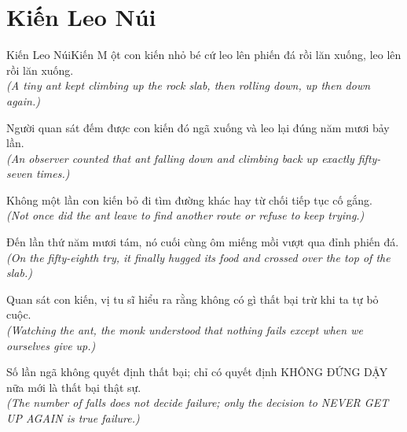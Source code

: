 \section{Kiến Leo Núi}
\begin{truyen}{Kiến Leo Núi}{Kiến}
M ột con kiến nhỏ bé cứ leo lên phiến đá rồi lăn xuống, leo lên rồi lăn xuống.\\
\textit{(A tiny ant kept climbing up the rock slab, then rolling down, up then down again.)}

Người quan sát đếm được con kiến đó ngã xuống và leo lại đúng năm mươi bảy lần.\\
\textit{(An observer counted that ant falling down and climbing back up exactly fifty-seven times.)}

Không một lần con kiến bỏ đi tìm đường khác hay từ chối tiếp tục cố gắng.\\
\textit{(Not once did the ant leave to find another route or refuse to keep trying.)}

Đến lần thứ năm mươi tám, nó cuối cùng ôm miếng mồi vượt qua đỉnh phiến đá.\\
\textit{(On the fifty-eighth try, it finally hugged its food and crossed over the top of the slab.)}

Quan sát con kiến, vị tu sĩ hiểu ra rằng không có gì thất bại trừ khi ta tự bỏ cuộc.\\
\textit{(Watching the ant, the monk understood that nothing fails except when we ourselves give up.)}

\end{truyen}
\begin{baihoc}
  Số lần ngã không quyết định thất bại; chỉ có quyết định KHÔNG ĐỨNG DẬY nữa mới là thất bại thật sự.\\
  \textit{(The number of falls does not decide failure; only the decision to NEVER GET UP AGAIN is true failure.)}
\end{baihoc}

